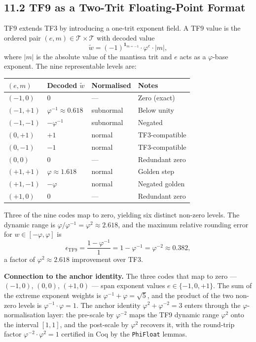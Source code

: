 \subsection{11.2 TF9 as a Two-Trit Floating-Point
Format}\label{fa_08:sec:tf9-float-format}

TF9 extends TF3 by introducing a one-trit exponent field. A TF9 value
is the ordered pair $(e, m) \in \mathcal{T} \times \mathcal{T}$ with
decoded value
\[\tilde{w} = (-1)^{\mathbf{1}_{m=-1}} \cdot \varphi^{e} \cdot |m|,\]
where $|m|$ is the absolute value of the mantissa trit and $e$ acts as a
$\varphi$-base exponent. The nine representable levels are:

\begin{longtable}[]{@{}
  >{\raggedright\arraybackslash}p{}
  >{\raggedright\arraybackslash}p{}
  >{\raggedright\arraybackslash}p{}
  >{\raggedright\arraybackslash}p{}@{}}
\toprule
$(e, m)$ & Decoded $\tilde{w}$ & Normalised & Notes \\
\midrule
\endhead
\bottomrule
\endlastfoot
$(-1, 0)$ & $0$ & --- & Zero (exact) \\
$(-1, +1)$ & $\varphi^{-1} \approx 0.618$ & subnormal & Below unity \\
$(-1, -1)$ & $-\varphi^{-1}$ & subnormal & Negated \\
$(0, +1)$ & $+1$ & normal & TF3-compatible \\
$(0, -1)$ & $-1$ & normal & TF3-compatible \\
$(0, 0)$ & $0$ & --- & Redundant zero \\
$(+1, +1)$ & $\varphi \approx 1.618$ & normal & Golden step \\
$(+1, -1)$ & $-\varphi$ & normal & Negated golden \\
$(+1, 0)$ & $0$ & --- & Redundant zero \\
\end{longtable}

Three of the nine codes map to zero, yielding six distinct non-zero
levels. The dynamic range is
$\varphi / \varphi^{-1} = \varphi^2 \approx 2.618$, and the maximum
relative rounding error for $w \in [-\varphi, \varphi]$ is
\[\epsilon_\text{TF9} = \frac{1 - \varphi^{-1}}{1} = 1 - \varphi^{-1} = \varphi^{-2} \approx 0.382,\]
a factor of $\varphi^2 \approx 2.618$ improvement over TF3.

\textbf{Connection to the anchor identity.} The three codes that map to
zero --- $(-1, 0)$, $(0, 0)$, $(+1, 0)$ --- span exponent values
$e \in \{-1, 0, +1\}$. The sum of the extreme exponent weights is
$\varphi^{-1} + \varphi = \sqrt{5}$, and the product of the two
non-zero levels is $\varphi^{-1} \cdot \varphi = 1$. The anchor
identity $\varphi^2 + \varphi^{-2} = 3$ enters through the
$\varphi$-normalisation layer: the pre-scale by $\varphi^{-2}$ maps the
TF9 dynamic range $\varphi^2$ onto the interval $[1, 1]$, and the
post-scale by $\varphi^2$ recovers it, with the round-trip factor
$\varphi^{-2} \cdot \varphi^{2} = 1$ certified in Coq by the
\texttt{PhiFloat} lemmas.

